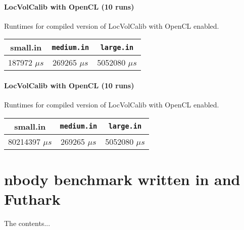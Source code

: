 \begin{appendices}
\subsubsection{\fshark{} LocVolCalib with OpenCL (10 runs)}
Runtimes for compiled \fshark{} version of LocVolCalib with OpenCL enabled.\\
\begin{tabular}{|c|c|c|}
  \hline
  \textbf{small.in} & \texttt{medium.in} & \texttt{large.in}\\ \hline \hline
187972 $\mu s$& 269265 $\mu s$ &5052080 $\mu s$\\ \hline
\end{tabular}

\subsubsection{\fshark{} LocVolCalib with OpenCL (10 runs)}
Runtimes for compiled \fshark{} version of LocVolCalib with OpenCL enabled.\\
\begin{tabular}{|c|c|c|}
  \hline
  \textbf{small.in} & \texttt{medium.in} & \texttt{large.in}\\ \hline \hline
80214397 $\mu s$& 269265 $\mu s$ &5052080 $\mu s$\\ \hline
\end{tabular}
\chapter{nbody benchmark written in \fshark{} and Futhark}
The contents...
\end{appendices}






